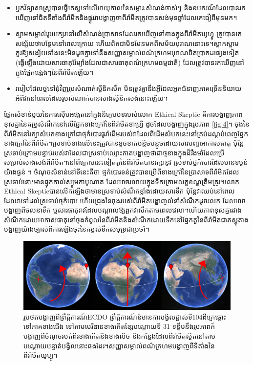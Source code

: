 \documentclass[10pt,twocolumn,letterpaper]{article}
\begin{document}
\begin{flushleft}
\begin{itemize}
    \item អ្នកវិទ្យាសាស្ត្របានធ្វើតេស្តទៅលើអាយុកាលនៃសម្ភារៈសំណង់ចាស់ៗ និងឧបករណ៍ដែលបានរកឃើញនៅជិតទីតាំងពីរ៉ាមីតនិងផ្នូរ​វាបង្ហាញថាពីរ៉ាមីតត្រូវបានសង់មុនឆ្នាំដែលគេជឿពីមុនមក។
    \item ស្នាមសម្គាល់​រូប​អក្សរ​នៅលើសំណង់ប្រាសាទដែលរកឃើញនៅខាងក្នុងពីរ៉ាមីតឃូហ្វូ ត្រូវបានគេសង្ស័យថាបន្ថែមនៅពេលក្រោយ ហើយពិតជាមិនមែនមកពីសម័យបុរាណនោះទេ។ស្លាកស្នាមគួរឱ្យសង្ស័យទាំងនេះមិនដូចគ្នាទៅនឹងសញ្ញាសម្គាល់ពណ៌ក្រហមបុរាណពិតប្រាកដផ្សេងទៀត (ធ្វើឡើងដោយសារធាតុរ៉ែម្យ៉ាងដែលជាសារធាតុពណ៌ក្រហមធម្មជាតិ) ដែលត្រូវបានរកឃើញនៅក្នុងផ្នែកផ្សេងៗនៃពីរ៉ាមីតឡើយ។
    \item របៀបដែលថ្មនៅជុំវិញរូបសំណាក់ស្វីនិកសឹក មិនត្រូវគ្នានឹងអ្វីដែលអ្នកជំនាញភាគច្រើននិយាយអំពីវានៅពេលដែលរូបសំណាក់បានសាងស្វីនិកសង់នោះឡើយ។
\end{itemize}
\end{flushleft}

ផ្នែកសំខាន់មួយនៃការស៊ើបអង្កេតនៅក្នុងនិក្ខេបបទរបស់លោក Ethical Skeptic 
គឺការបង្ហាញភាពខុសគ្នានៃគម្រូសំណឹកនៅលើផ្នែកខាងក្រៅនៃពីរ៉ាមីតខាហ្រ្វឺ ដូចដែលបង្ហាញក្នុងរូបភាព \ref{fig:4}។ ចុងនៃពីរ៉ាមីតនៅរក្សាសំបកខាងក្រៅជាថ្មកំបោរធូរ៉ាដើមរបស់វា​ដែលពីដើមសំបកនេះនៅគ្រប់ដណ្តប់ពេញផ្នែកខាងក្រៅនៃពីរ៉ាមីត។ស្រទាប់ខាងលើនេះត្រូវបានខូចខាតបន្តិចបន្តួចដោយសារបញ្ហាអាកាសធាតុ ប៉ុន្តែស្រទាប់ក្រោមបន្ទាប់របស់វាដែលជាស្រទាប់ឈ្មោះកាត​បង្ហាញថាជាថ្មខាងក្នុងដ៏រឹងមាំដែលប្រើសម្រាប់សាងសង់ពីរ៉ាមីត។​នៅពីក្រោមនេះទៀត​ តួនៃពីរ៉ាមីតបានរក្សា​នូវ​
ស្រទាប់ថ្មកំបោរដែលមានទម្ងន់យ៉ាងធ្ងន់ ។ ចំណុចសំខាន់នៅទីនេះគឺថា ថ្មកំបោរទន់​ត្រូវបានប្រើពីខាងក្រៅនៃប្រាសាទពីរ៉ាមីតដែលស្រទាប់នោះមានផ្ទុកកាល់ស្យូមកាបូណាត ដែលអាចរលាយក្នុងទឹកក្រោមលក្ខខណ្ឌត្រឹមត្រូវ។លោក Ethical Skepticបានលើកឡើងថាមានស្រទាប់សំណឹកខ្លាំងដោយសារទឹក ប៉ុន្តែវាឈប់នៅពេលដែលវាទៅដល់ស្រទាប់ថ្មកំបោរ ហើយជ្រុងនៃចុងរបស់ពីរ៉ាមីតបង្ហាញលំនាំសំណឹកដូចរលក ដែលអាចបង្ហាញពីចលនាទឹក ឬសារធាតុរាវដែលបណ្តាលឱ្យពួកវាសឹកតាមពេលវេលា។​ហើយភាពខុសគ្នារវាងសំណឹកដោយអាកាសធាតុនៅចុងកំពូលនៃពីរ៉ាមីត​និងសំណឹកដោយទឹកនៅផ្នែកតួនៃពីរ៉ាមីត​ជាភស្តុតាងបង្ហាញយ៉ាងច្បាស់ពីការឡើងចុះនៃកម្ពស់ទឹកសមុទ្រជាប្រចាំ\cite{27}។

\begin{figure}[b]
\begin{center}
\includegraphics[width=1\textwidth]{drawing.jpg}
\end{center}
   \caption{រូបថតបង្ហាញពីព្រឹត្តិការណ៍ECDO ព្រឹត្តិការណ៍នំមានការបង្វិលផ្លាស់ទី104ដឺក្រេឆ្ពោះទៅភាគខាងជើង ទៅតាមមេរីឌានខាងកើតខ្សែបណ្តោយទី 31 ទន្ទឹមនឹងរូបភាពក៍បង្ហាញពីចំណុចរបត់ពីរខាងកើតនិងខាងលិច និងកន្លែងដែលពីរ៉ាមីតស្ថិតនៅតាមបណ្តោយបន្ទាត់បង្វិលនោះផងដែរ។សញ្ញាសម្គាល់ពណ៌ក្រហមបង្ហាញពីទីតាំងនៃពីរ៉ាមីតឃូហ្វូ។}
\label{fig:6}
\end{figure}
\end{document}
